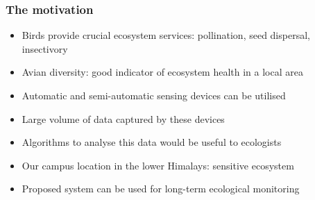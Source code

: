 \documentclass[mathserif]{beamer}
\begin{document}
\begin{frame}
\frametitle{The motivation}
\begin{itemize}
\item<2-> Birds provide crucial ecosystem services: pollination, seed dispersal,
insectivory
\item<3-> Avian diversity: good indicator of ecosystem health in a local area
\item<4-> Automatic and semi-automatic sensing devices can be utilised
\item<5-> Large volume of data captured by these devices
\item<6-> Algorithms to analyse this data would be useful to ecologists
\item<7-> Our campus location in the lower Himalays: sensitive ecosystem
\item<8-> Proposed system can be used for long-term ecological monitoring
\end{itemize}
\end{frame}
\end{document}
